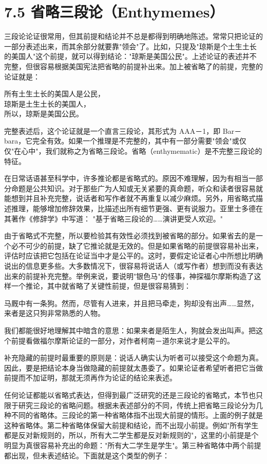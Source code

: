 \section*{7.5 省略三段论（Enthymemes）}
三段论论证很常用，但其前提和结论并不总是都得到明确地陈述。常常只把论证的一部分表述出来，而其余部分就要靠"领会"了。比如，只提及"琼斯是个土生土长的美国人"这个前提，就可以得到结论："琼斯是美国公民"。上述论证的表述并不完整，但很容易根据美国宪法把省略的前提补出来。加上被省略了的前提，完整的论证就是：

\begin{displayquote}
所有土生土长的美国人是公民，\\
琼斯是土生土长的美国人，\\
所以，琼斯是美国公民。
\end{displayquote}

完整表述后，这个论证就是一个直言三段论，其形式为 AAA－1，即 Bar－ bara，它完全有效。如果一个推理是不完整的，其中有一部分需要"领会"或仅仅"在心中"，我们就称之为省略三段论。省略（enthymematic）是不完整三段论的特征。

在日常话语甚至科学中，许多推论都是省略式的。原因不难理解，因为有相当一部分命题是公共知识。对于那些广为人知或无关紧要的真命题，听众和读者很容易就能想到并且补充完整，说话者和写作者就不再重复以减少麻烦。另外，用省略式描述推理，能够增加修辞效果，比描述出所有细节更强、更有说服力。亚里士多德在其著作《修辞学》中写道： "基于省略三段论的……演讲更受人欢迎。"

由于省略式不完整，所以要检验其有效性必须找到被省略的部分。如果省去的是一个必不可少的前提，缺了它推论就是无效的。但是如果省略的前提很容易补出来，评估时应该把它包括在论证当中才是公平的。这时，要假定论证者心中所想比明确说出的信息更多些。大多数情况下，很容易将说话人（或写作者）想到而没有表达出来的前提补充完整。举例来说，要说明"银色马"的怪事，神探福尔摩斯构造了这样一个推论，其中就省略了关键性前提，但是很容易猜到：

马厩中有一条狗。然而，尽管有人进来，并且把马牵走，狗却没有出声……显然，来者是这只狗非常熟悉的人物。

我们都能很好地理解其中暗含的意思：如果来者是陌生人，狗就会发出叫声。把这个前提看做福尔摩斯论证的一部分，对作者柯南－道尔来说才是公平的。

补充隐藏的前提时最重要的原则是：说话人确实认为听者可以接受这个命题为真。因此，要是把结论本身当做隐藏的前提就太愚委了。如果论证者希望听者把它当做前提而不加证明，那就无须再作为论证的结论来表述。

任何论证都能以省略式表达，但得到最广泛研究的还是三段论的省略式，本节也只限于研究三段论的省略问题。根据未表述部分的不同，传统上把省略三段论分为几种不同的省略体。三段论的第一种省略体指不出现大前提的情形。上面的例子就是这种省略体。第二种省略体保留大前提和结论，而不出现小前提。例如"所有学生都是反对新规则的，所以，所有大二学生都是反对新规则的"，这里的小前提是个明显为真很容易补充出的命题："所有大二学生是学生"。第三种省略体中两个前提都出现，但未表述结论。下面就是这个类型的例子：

